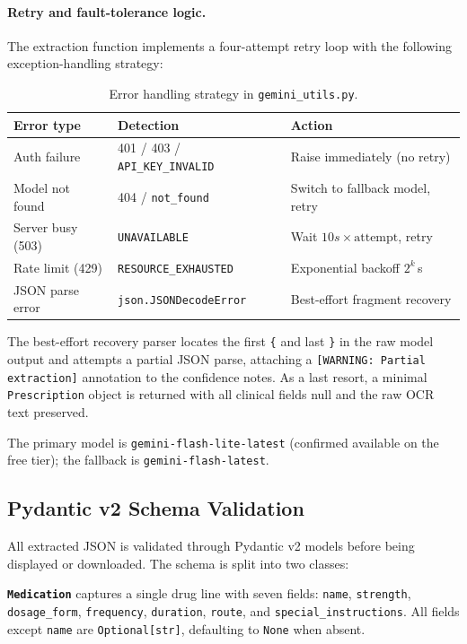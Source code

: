 \documentclass[12pt,a4paper]{article}
\begin{document}
\paragraph{Retry and fault-tolerance logic.}
The extraction function implements a four-attempt retry loop with the following
exception-handling strategy:

\begin{table}[H]
\centering
\caption{Error handling strategy in \texttt{gemini\_utils.py}.}
\label{tab:errors}
\begin{tabular}{@{}lll@{}}
\toprule
\textbf{Error type} & \textbf{Detection} & \textbf{Action} \\
\midrule
Auth failure      & 401 / 403 / \texttt{API\_KEY\_INVALID}  & Raise immediately (no retry) \\
Model not found   & 404 / \texttt{not\_found}               & Switch to fallback model, retry \\
Server busy (503) & \texttt{UNAVAILABLE}                    & Wait $10s \times \text{attempt}$, retry \\
Rate limit (429)  & \texttt{RESOURCE\_EXHAUSTED}            & Exponential backoff $2^k$\,s \\
JSON parse error  & \texttt{json.JSONDecodeError}           & Best-effort fragment recovery \\
\bottomrule
\end{tabular}
\end{table}

The best-effort recovery parser locates the first \texttt{\{} and last \texttt{\}}
in the raw model output and attempts a partial JSON parse, attaching a
\texttt{[WARNING: Partial extraction]} annotation to the confidence notes.
As a last resort, a minimal \texttt{Prescription} object is returned with all
clinical fields null and the raw OCR text preserved.

The primary model is \texttt{gemini-flash-lite-latest} (confirmed available on
the free tier); the fallback is \texttt{gemini-flash-latest}.

\subsection{Pydantic v2 Schema Validation}

All extracted JSON is validated through Pydantic v2 models before being displayed
or downloaded. The schema is split into two classes:

\textbf{\texttt{Medication}} captures a single drug line with seven fields:
\texttt{name}, \texttt{strength}, \texttt{dosage\_form}, \texttt{frequency},
\texttt{duration}, \texttt{route}, and \texttt{special\_instructions}.
All fields except \texttt{name} are \texttt{Optional[str]}, defaulting to
\texttt{None} when absent.
\end{document}
